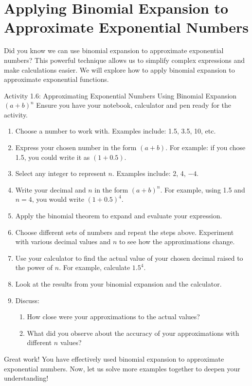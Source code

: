 \section{Applying Binomial Expansion to Approximate Exponential Numbers}

Did you know we can use binomial expansion to approximate exponential
numbers? This powerful technique allows us to simplify complex expressions
and make calculations easier. We will explore how to apply binomial expansion
to approximate exponential functions.

\begin{activity}{Activity 1.6: Approximating Exponential Numbers Using Binomial Expansion $(a+b)^n$}
Ensure you have your notebook, calculator and pen ready for the activity.
\begin{enumerate}
  \item Choose a number to work with. Examples include: 1.5, 3.5, 10, etc.
  \item Express your chosen number in the form $(a+b)$. For example: if you chose
  1.5, you could write it as $(1+0.5)$.
  \item Select any integer to represent $n$. Examples include: 2, 4, $-4$.
  \item Write your decimal and $n$ in the form $(a+b)^n$. For example, using 1.5
  and $n=4$, you would write $(1+0.5)^4$.
  \item Apply the binomial theorem to expand and evaluate your expression.
  \item Choose different sets of numbers and repeat the steps above. Experiment
  with various decimal values and $n$ to see how the approximations change.
  \item Use your calculator to find the actual value of your chosen decimal raised
  to the power of $n$. For example, calculate $1.5^4$.
  \item Look at the results from your binomial expansion and the calculator.
  \item Discuss:
  \begin{enumerate}
    \item[a.] How close were your approximations to the actual values?
    \item[b.] What did you observe about the accuracy of your approximations
    with different $n$ values?
  \end{enumerate}
\end{enumerate}
\end{activity}

Great work! You have effectively used binomial expansion to approximate
exponential numbers. Now, let us solve more examples together to deepen your
understanding!

